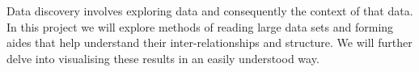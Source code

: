 {%
    Data discovery involves exploring data and consequently the context of that data.
    In this project we will explore methods of reading large data sets and forming aides that help understand their
    inter-relationships and structure.
    We will further delve into visualising these results in an easily understood way.
}